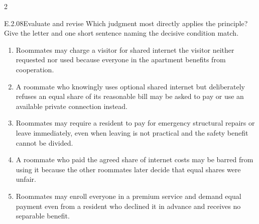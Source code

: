 \documentclass[9pt]{extarticle}
\newcommand{\choice}[1]{\item #1}
\begin{document}
\begin{multicols}{2}
\begin{DenseCoreProblem}{E.2.08}{Evaluate and revise}
Which judgment most directly applies the principle? Give the letter and one short sentence naming the decisive condition match.
\begin{enumerate}[label=(\alph*)]
  \choice{Roommates may charge a visitor for shared internet the visitor neither requested nor used because everyone in the apartment benefits from cooperation.}
  \choice{A roommate who knowingly uses optional shared internet but deliberately refuses an equal share of its reasonable bill may be asked to pay or use an available private connection instead.}
  \choice{Roommates may require a resident to pay for emergency structural repairs or leave immediately, even when leaving is not practical and the safety benefit cannot be divided.}
  \choice{A roommate who paid the agreed share of internet costs may be barred from using it because the other roommates later decide that equal shares were unfair.}
  \choice{Roommates may enroll everyone in a premium service and demand equal payment even from a resident who declined it in advance and receives no separable benefit.}
\end{enumerate}
\end{DenseCoreProblem}
\end{multicols}
\CoreWorkArea
\FormBreak
{}
\end{document}
